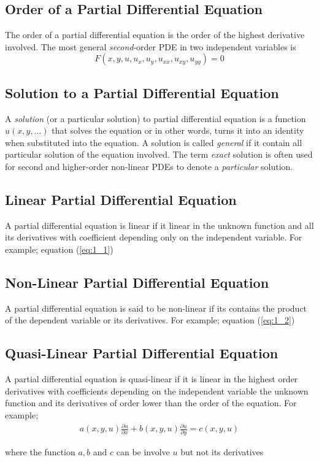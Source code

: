 \documentclass[11pt]{report}
\newcommand{\refn}[1]{(\ref{#1})}
\newcommand{\refx}[1]{\refn{eq:#1}}
\begin{document}
	\subsection{Order of a Partial Differential Equation}
	The order of a partial differential equation is the order of the highest derivative involved. The most general \textit{second}-order PDE in two independent variables is
	\begin{equation}
		F(x,y,u,u_x,u_y,u_{xx}, u_{xy}, u_{yy})=0
	\end{equation}

	\subsection{Solution to a Partial Differential Equation}
	A \textit{solution} (or a particular solution) to partial differential equation is a function $u(x,y,\ldots)$ that solves the equation or in other words, turns it into an identity when substituted into the equation. A solution is called \textit{general} if it contain all particular solution of the equation involved. The term \textit{exact} solution is often used for second and higher-order non-linear PDEs to denote a \textit{particular} solution.\\
	
	\subsection{Linear Partial Differential Equation}
	A partial differential equation is linear if it linear in the unknown function and all its derivatives with coefficient depending only on the independent variable. For example; equation \refx{1_1}
	
	\subsection{Non-Linear Partial Differential Equation}
	A partial differential equation is said to be non-linear if its contains the product of the dependent variable or its derivatives. For example; equation \refx{1_2}
	
	\subsection{Quasi-Linear Partial Differential Equation}
	A partial differential equation is quasi-linear if it is linear in the highest order derivatives with coefficients depending on the independent variable the unknown function and its derivatives of order lower than the order of the equation. For example;
	\begin{eqnarray}
		a(x,y,u)\frac{\partial u}{\partial x}+ b(x,y,u)\frac{\partial u}{\partial y} = c(x,y,u)\label{eq:3_7}
	\end{eqnarray}
	\begin{center}where the function $a,b$ and $c$ can be involve $u$ but not its derivatives\end{center}
	
\end{document}
